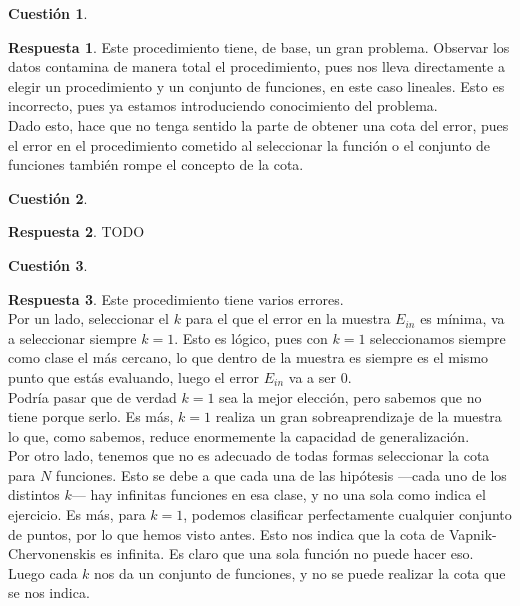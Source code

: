 \documentclass[10pt,a4paper]{article}
\theoremstyle{definition}
\newtheorem{cuestion}{Cuestión}
\newtheorem*{respuesta}{Respuesta}
\begin{document}
\begin{cuestion}
\end{cuestion}
\begin{respuesta}
Este procedimiento tiene, de base, un gran problema. Observar los datos contamina de manera total el procedimiento, pues nos lleva directamente a elegir un procedimiento y un conjunto de funciones, en este caso lineales. Esto es incorrecto, pues ya estamos introduciendo conocimiento del problema.\\

Dado esto, hace que no tenga sentido la parte de obtener una cota del error, pues el error en el procedimiento cometido al seleccionar la función o el conjunto de funciones también rompe el concepto de la cota.\\
 
\end{respuesta}

\begin{cuestion}
\end{cuestion}
\begin{respuesta}
TODO
\end{respuesta}

\begin{cuestion}
\end{cuestion}
\begin{respuesta}
Este procedimiento tiene varios errores.\\

Por un lado, seleccionar el $k$ para el que el error en la muestra $E_{in}$ es mínima, va a seleccionar siempre $k=1$. Esto es lógico, pues con $k=1$ seleccionamos siempre como clase el más cercano, lo que dentro de la muestra es siempre es el mismo punto que estás evaluando, luego el error $E_{in}$ va a ser 0.\\

Podría pasar que de verdad $k=1$ sea la mejor elección, pero sabemos que no tiene porque serlo. Es más, $k=1$ realiza un gran sobreaprendizaje de la muestra lo que, como sabemos, reduce enormemente la capacidad de generalización.\\
  
Por otro lado, tenemos que no es adecuado de todas formas seleccionar la cota para $N$ funciones. Esto se debe a que cada una de las hipótesis ---cada uno de los distintos $k$--- hay infinitas funciones en esa clase, y no una sola como indica el ejercicio. Es más, para $k=1$, podemos clasificar perfectamente cualquier conjunto de puntos, por lo que hemos visto antes. Esto nos indica que la cota de Vapnik-Chervonenskis es infinita. Es claro que una sola función no puede hacer eso. Luego cada $k$ nos da un conjunto de funciones, y no se puede realizar la cota que se nos indica.\\
  
\end{respuesta}
\end{document}
